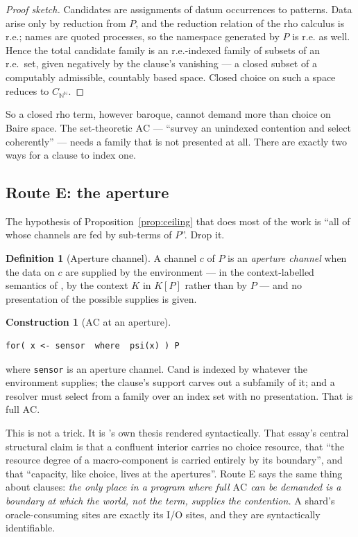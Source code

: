 \documentclass[11pt]{article}
\theoremstyle{definition}
\newtheorem{definition}{Definition}
\newtheorem{construction}{Construction}
\theoremstyle{plain}
\theoremstyle{remark}
\newcommand{\Cand}{\mathrm{Cand}}
\newcommand{\AC}{\mathrm{AC}}
\newcommand{\Bai}{\mathbb{N}^{\mathbb{N}}}
\begin{document}
\begin{proof}[Proof sketch]
Candidates are assignments of datum occurrences to patterns. Data arise only by
reduction from $P$, and the reduction relation of the rho calculus is r.e.; names are
quoted processes, so the namespace generated by $P$ is r.e. as well. Hence the total
candidate family is an r.e.-indexed family of subsets of an r.e.\ set, given negatively
by the clause's vanishing --- a closed subset of a computably admissible, countably
based space. Closed choice on such a space reduces to $C_{\Bai}$.
\end{proof}

So a closed rho term, however baroque, cannot demand more than choice on Baire space.
The set-theoretic $\AC$ --- ``survey an unindexed contention and select coherently''
\cite{choicesched} --- needs a family that is not presented at all. There are exactly
two ways for a clause to index one.

\subsection{Route E: the aperture}\label{ssec:aperture}

The hypothesis of Proposition~\ref{prop:ceiling} that does most of the work is ``all of
whose channels are fed by sub-terms of $P$''. Drop it.

\begin{definition}[Aperture channel]\label{def:aperture}
A channel $c$ of $P$ is an \emph{aperture channel} when the data on $c$ are supplied by
the environment --- in the context-labelled semantics of \cite{probing}, by the
context $K$ in $K[P]$ rather than by $P$ --- and no presentation of the possible
supplies is given.
\end{definition}

\begin{construction}[$\AC$ at an aperture]\label{cons:ac-e}
\begin{lstlisting}
for( x <- sensor  where  psi(x) ) P
\end{lstlisting}
where \texttt{sensor} is an aperture channel. $\Cand$ is indexed by whatever the
environment supplies; the clause's support carves out a subfamily of it; and a resolver
must select from a family over an index set with no presentation. That is full $\AC$.
\end{construction}

This is not a trick. It is \cite{agency}'s own thesis rendered syntactically. That
essay's central structural claim is that a confluent interior carries no choice
resource, that ``the resource degree of a macro-component is carried entirely by its
boundary'', and that ``capacity, like choice, lives at the apertures''. Route E says
the same thing about clauses: \emph{the only place in a program where full $\AC$ can be
demanded is a boundary at which the world, not the term, supplies the contention.} A
shard's oracle-consuming sites are exactly its I/O sites, and they are syntactically
identifiable.
\end{document}
